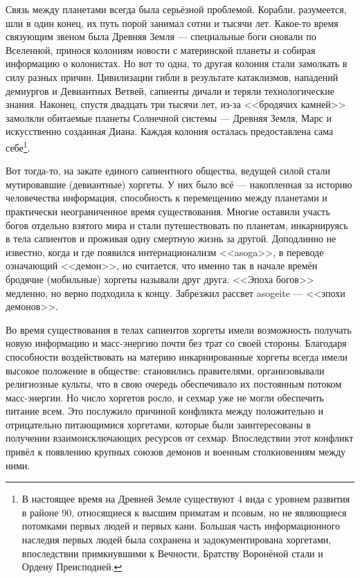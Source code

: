 \documentclass[a4paper,10pt]{book}
\begin{document}
Связь между планетами всегда была серьёзной проблемой. Корабли, разумеется, шли 
в один конец, их путь порой занимал сотни и тысячи лет. 
Какое-то время связующим звеном была Древняя Земля --- специальные боги сновали 
по Вселенной, принося колониям новости с материнской планеты
и собирая информацию о колонистах. Но вот то одна, то другая 
колония стали замолкать в силу разных причин.
Цивилизации гибли в результате катаклизмов, нападений демиургов и Девиантных 
Ветвей, сапиенты дичали и теряли технологические знания.
Наконец, спустя двадцать три тысячи лет, из-за <<бродячих камней>> замолкли 
обитаемые планеты Солнечной системы ---
Древняя Земля, Марс и искусственно созданная Диана. Каждая колония осталась 
предоставлена сама себе\footnote{В 
настоящее время на Древней Земле существуют 4 вида с уровнем развития в районе 
90, 
относящиеся к высшим приматам и псовым, но не являющиеся потомками первых людей 
и первых кани. Большая часть информационного наследия первых людей была
сохранена и задокументирована хоргетами, впоследствии примкнувшими к Вечности, 
Братству Воронёной стали и Ордену Преисподней.}.

Вот тогда-то, на закате единого сапиентного общества, ведущей силой стали 
мутировавшие (девиантные) хоргеты. У них 
было всё --- накопленная за историю человечества информация, способность к 
перемещению между планетами и практически неограниченное время существования. 
Многие оставили участь богов отдельно взятого мира и стали путешествовать по 
планетам, инкарнируясь в тела сапиентов и проживая одну смертную жизнь за 
другой. Доподлинно не известно, когда и где появился интернационализм 
<<asoga>>, в 
переводе означающий  <<демон>>, но считается, что именно так в начале времён 
бродячие (мобильные) хоргеты называли друг друга. <<Эпоха богов>> медленно, но 
верно подходила к концу. Забрезжил рассвет asogeite --- <<эпохи демонов>>.

Во время существования в телах сапиентов хоргеты имели возможность получать 
новую информацию и масс-энергию
почти без трат со своей стороны. Благодаря способности воздействовать на 
материю 
инкарнированные хоргеты всегда имели 
высокое положение в обществе: становились правителями, организовывали 
религиозные культы, что в свою очередь обеспечивало их постоянным потоком 
масс-энергии. Но число хоргетов росло, и сехмар уже не могли обеспечить питание 
всем. Это послужило причиной конфликта между положительно и отрицательно 
питающимися хоргетами, которые были заинтересованы в получении 
взаимоисключающих ресурсов от сехмар. Впоследствии этот конфликт привёл к 
появлению крупных союзов демонов и военным столкновениям между ними.
\end{document}
